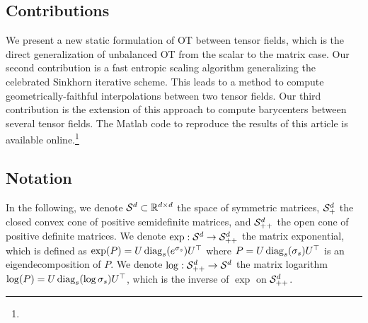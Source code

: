 



\subsection{Contributions} 

We present a new static formulation of OT between tensor fields, which is the direct generalization of unbalanced OT from the scalar to the matrix case.
%
Our second contribution is a fast entropic scaling algorithm generalizing the celebrated Sinkhorn iterative scheme. This leads to a method to compute geometrically-faithful interpolations between two tensor fields. 
%
Our third contribution is the extension of this approach to compute barycenters between several tensor fields. 
%
The Matlab code to reproduce the results of this article is available online.\footnote{
}

% 


\subsection{Notation}

In the following, we denote $\mathcal{S}^d \subset \mathbb{R}^{d \times d}$ the space of symmetric matrices, $\mathcal{S}_+^d$ the closed convex cone of positive semidefinite matrices, and $\mathcal{S}_{++}^d$ the open cone of positive definite matrices. 
%
We denote $\exp: \mathcal{S}^d \to \mathcal{S}_{++}^d$ the matrix exponential, which is defined as $\exp(P)=U \operatorname{diag}_s(e^{\sigma_s})U^\top$ where $P=U \operatorname{diag}_s(\sigma_s) U^\top$ is an eigendecomposition of $P$.
We denote $\log: \mathcal{S}_{++}^d \to \mathcal{S}^d$ the matrix logarithm $\log(P)=U \operatorname{diag}_s(\log \sigma_s)U^\top$, which is the inverse of $\exp$ on $\mathcal{S}_{++}^d$. %


